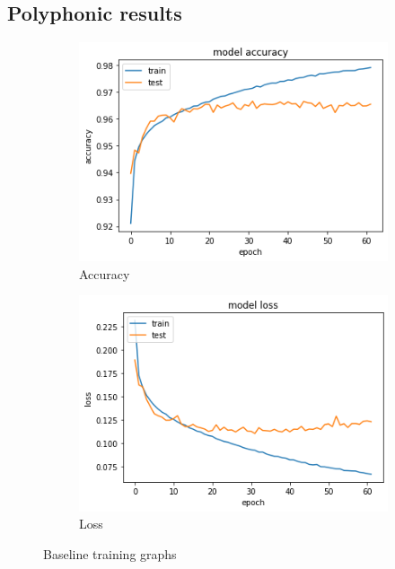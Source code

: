 \documentclass{article}
\begin{document}
\subsection{Polyphonic results}
\label{subsec:poly_results}

\begin{figure}[H]
	\centering
	\begin{subfigure}{.5\textwidth}
		\centering
		\includegraphics[width=.95\linewidth]{./images/poly/baseline_acc.png}
		\caption{Accuracy}
	\end{subfigure}%
	\begin{subfigure}{.5\textwidth}
		\centering
		\includegraphics[width=.95\linewidth]{./images/poly/baseline_loss.png}
		\caption{Loss}
	\end{subfigure}
	\caption{Baseline training graphs}
	\label{fig:poly_base_result}
\end{figure}
\end{document}
